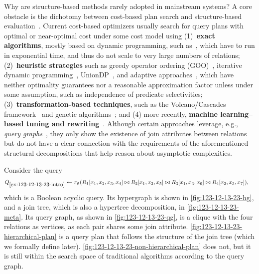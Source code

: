 Why are structure-based methods rarely adopted in mainstream systems? A core obstacle is the dichotomy between cost-based plan search and structure-based evaluation~\cite{koutris_database_2026}. Current cost-based optimizers usually search for query plans with optimal or near-optimal cost under some cost model using
(1)~\textbf{exact algorithms}, mostly based on dynamic programming, such as~\cite{selinger_access_1979,vance_rapid_1996,vance_join-order_1998,moerkotte_dynamic_2008,stoian_dpconv_2024}, which have to run in exponential time, and thus do not scale to very large numbers of relations;
(2)~\textbf{heuristic strategies} such as greedy operator ordering (GOO)~\cite{fegaras_new_1998}, 
iterative dynamic programming~\cite{kossmann_iterative_2000}, UnionDP~\cite{mancini_efficient_2022}, and adaptive approaches~\cite{neumann_adaptive_2018,birler_optimizing_2025}, which have neither optimality guarantees nor a reasonable approximation factor unless under some assumption, such as independence of predicate selectivities;
(3)~\textbf{transformation-based techniques}, such as the Volcano/Cascades framework~\cite{graefe_volcano_1993,graefe_cascades_1995} and genetic algorithms~\cite{bennett_genetic_1991};
and
(4) more recently, \textbf{machine learning--based tuning and rewriting}~\cite{marcus_bao_2021,yang_balsa_2022,chen_efficient_2022,zhou_learned_2023,zhou_learned_2021,li_llm-r2_2024}.
Although certain approaches leverage, e.g., \emph{query graphs}~\cite{moerkotte_dynamic_2008,neumann_adaptive_2018,mancini_efficient_2022,birler_optimizing_2025}, they only show the existence of join attributes between relations but do not have a clear connection with the requirements of the aforementioned structural decompositions that help reason about asymptotic complexities.


\begin{example} \label{ex:123-12-13-23-intro}
    Consider the query
    \begin{align*}
        Q_{\ref{ex:123-12-13-23-intro}} \gets \pi_{\emptyset} (& R_1[x_1, x_2, x_3, x_4] \bowtie R_2[x_1, x_2, x_5] \bowtie R_3[x_1, x_3, x_6] \bowtie R_4[x_2, x_3, x_7]),
    \end{align*}
    which is a Boolean acyclic query.
    Its hypergraph is shown in \cref{fig:123-12-13-23-hg}, and a join tree, which is also a hypertree decomposition, in \cref{fig:123-12-13-23-meta}.
    Its query graph, as shown in \cref{fig:123-12-13-23-qg}, is a clique with the four relations as vertices, as each pair shares some join attribute.
    \cref{fig:123-12-13-23-hierarchical-plan} is a query plan that follows the structure of the join tree (which we formally define later). \cref{fig:123-12-13-23-non-hierarchical-plan} does not, but it is still within the search space of traditional algorithms according to the query graph.
\end{example}

